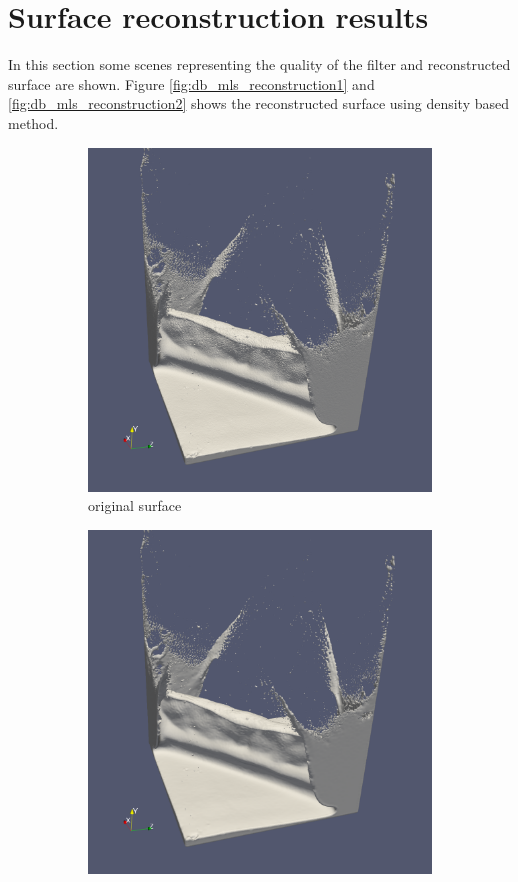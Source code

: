 \section{Surface reconstruction results}
In this section some scenes representing the quality of the filter and reconstructed surface are shown. 
Figure \ref{fig:db_mls_reconstruction1} and \ref{fig:db_mls_reconstruction2} shows the reconstructed surface using density based method.
\begin{figure}
	\begin{center}
		\begin{subfigure}[b]{0.47\textwidth}
			\includegraphics[width=\textwidth]{figures/DDMOriginal1.png}
			\caption{original surface}
		\end{subfigure}
		\begin{subfigure}[b]{0.47\textwidth}
			\includegraphics[width=\textwidth]{figures/DDMMls1.png}

\end{subfigure}
\end{center}
\end{figure}
